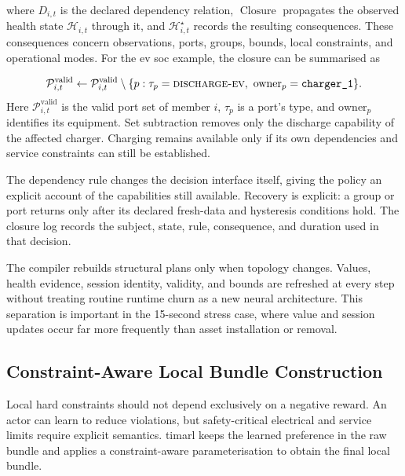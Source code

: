 where $D_{i,t}$ is the declared dependency relation, $\operatorname{Closure}$ propagates the observed health state $\mathcal H_{i,t}$ through it, and $\mathcal H^\star_{i,t}$ records the resulting consequences. These consequences concern observations, ports, groups, bounds, local constraints, and operational modes. For the \gls{ev} \gls{soc} example, the closure can be summarised as

\begin{equation}
\mathcal P^{\mathrm{valid}}_{i,t}
\leftarrow
\mathcal P^{\mathrm{valid}}_{i,t}\setminus
\{p:\tau_p=\textsc{discharge-ev},\ \mathrm{owner}_p=\texttt{charger\_1}\}.
\label{eq:timarl-health-port-removal}
\end{equation}
Here $\mathcal P^{\mathrm{valid}}_{i,t}$ is the valid port set of member $i$, $\tau_p$ is a port's type, and $\mathrm{owner}_p$ identifies its equipment. Set subtraction removes only the discharge capability of the affected charger. Charging remains available only if its own dependencies and service constraints can still be established.

The dependency rule changes the decision interface itself, giving the policy an explicit account of the capabilities still available. Recovery is explicit: a group or port returns only after its declared fresh-data and hysteresis conditions hold. The closure log records the subject, state, rule, consequence, and duration used in that decision.

The compiler rebuilds structural plans only when topology changes. Values, health evidence, session identity, validity, and bounds are refreshed at every step without treating routine runtime churn as a new neural architecture. This separation is important in the 15-second stress case, where value and session updates occur far more frequently than asset installation or removal.

\subsection{Constraint-Aware Local Bundle Construction}
\label{sec:timarl-local-feasibility}

Local hard constraints should not depend exclusively on a negative reward. An actor can learn to reduce violations, but safety-critical electrical and service limits require explicit semantics. \gls{timarl} keeps the learned preference in the raw bundle and applies a constraint-aware parameterisation to obtain the final local bundle.

